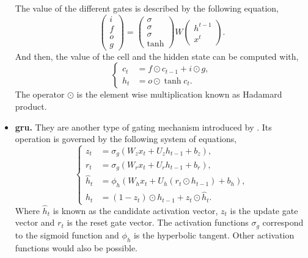 \begin{itemize}
  The value of the different gates is described by the following equation,
  \begin{equation}
    \begin{pmatrix}
      i \\
      f \\
      o \\
      g
    \end{pmatrix} =
    \begin{pmatrix}
      \sigma \\
      \sigma \\
      \sigma \\
      \tanh
    \end{pmatrix}
    W
    \begin{pmatrix}
      h^{t-1} \\
      x^t
    \end{pmatrix}.
  \end{equation}
  And then, the value of the cell and the hidden state can be computed with,
  \begin{equation}
    \begin{cases}
      c_t &= f \odot c_{t-1} + i \odot g, \\
      h_t &= o \odot \tanh c_{t}.
    \end{cases}
  \end{equation}
  The operator \(\odot\) is the element wise multiplication known as Hadamard
  product.
  \item \textbf{\gls{gru}.} They are another type of gating mechanism
  introduced by . Its operation is governed by the
  following system of equations,
  \begin{equation}
    \begin{cases}
      z_{t}&=\sigma _{g}(W_{z}x_{t}+U_{z}h_{t-1}+b_{z}), \\
      r_{t}&=\sigma _{g}(W_{r}x_{t}+U_{r}h_{t-1}+b_{r}), \\
      {\hat {h}}_{t}&=\phi _{h}(W_{h}x_{t}+U_{h}(r_{t}\odot h_{t-1})+b_{h}), \\
      h_{t}&=(1-z_{t})\odot h_{t-1}+z_{t}\odot {\hat {h}}_{t}.
    \end{cases}
  \end{equation}
  Where \(\hat{h}_t\) is known as the candidate activation vector, \(z_t\) is
  the update gate vector and \(r_t\) is the reset gate vector. The activation
  functions \(\sigma_g\) correspond to the sigmoid function and \(\phi_{h}\) is
  the hyperbolic tangent. Other activation functions would also be possible.
\end{itemize}

